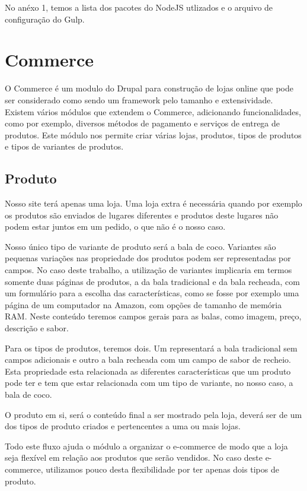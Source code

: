No anéxo 1, temos a lista dos pacotes do NodeJS utlizados e o arquivo de configuração do Gulp.

\section{Commerce}
O Commerce é um modulo do Drupal para construção de lojas online que pode ser considerado como sendo um framework pelo tamanho e extensividade. Existem vários módulos que extendem o Commerce, adicionando funcionalidades, como por exemplo, diversos métodos de pagamento e serviços de entrega de produtos. Este módulo nos permite criar várias lojas, produtos, tipos de produtos e tipos de variantes de produtos.

\subsection{Produto}
Nosso site terá apenas uma loja. Uma loja extra é necessária quando por exemplo os produtos são enviados de lugares diferentes e produtos deste lugares não podem estar juntos em um pedido, o que não é o nosso caso.

Nosso único tipo de variante de produto será a bala de coco. Variantes são pequenas variações nas propriedade dos produtos podem ser representadas por campos. No caso deste trabalho, a utilização de variantes implicaria em termos somente duas páginas de produtos, a da bala tradicional e da bala recheada, com um formulário para a escolha das características, como se fosse por exemplo uma página de um computador na Amazon, com opções de tamanho de memória RAM. Neste conteúdo teremos campos gerais para as balas, como imagem, preço, descrição e sabor.

Para os tipos de produtos, teremos dois. Um representará a bala tradicional sem campos adicionais e outro a bala recheada com um campo de sabor de recheio. Esta propriedade esta relacionada as diferentes características que um produto pode ter e tem que estar relacionada com um tipo de variante, no nosso caso, a bala de coco.

O produto em si, será o conteúdo final a ser mostrado pela loja, deverá ser de um dos tipos de produto criados e pertencentes a uma ou mais lojas.

Todo este fluxo ajuda o módulo a organizar o e-commerce de modo que a loja seja flexível em relação aos produtos que serão vendidos. No caso deste e-commerce, utilizamos pouco desta flexibilidade por ter apenas dois tipos de produto.

